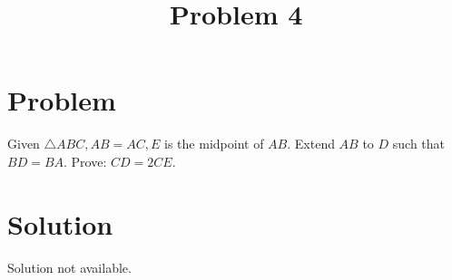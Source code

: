 \documentclass{article}
\title{Problem 4}
\date{}
\begin{document}
\maketitle

\section*{Problem}
Given \(\triangle A B C, A B=A C, E\) is the midpoint of \(A B\). Extend \(A B\) to \(D\) such that \(B D=B A\). Prove: \(C D=2 C E\).

\section*{Solution}
Solution not available.
\end{document}
